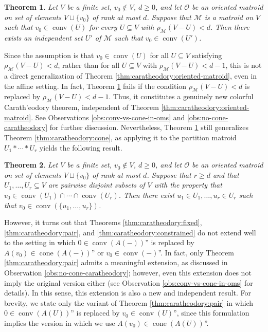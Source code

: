 \documentclass[a4paper,11pt,reqno, english]{amsart}
\newtheorem{theorem}{Theorem}[section]
\theoremstyle{definition}
\theoremstyle{remark}
\DeclareMathOperator{\cone}{\mathrm{cone}}
\DeclareMathOperator{\conv}{\mathrm{conv}}
\begin{document}
\begin{theorem}\label{thm:caratheodory:om-cone-matroid}
    Let $V$ be a finite set, $v_0\notin V$, $d\geq 0$, and let $\mathscr{O}$ be an oriented matroid on set of elements $V\sqcup\{v_0\}$ of rank at most $d$. 
    Suppose that $\mathscr{M}$ is a matroid on $V$ such that $v_0\in\conv(U)$ for every $U\subseteq V$ with $\rho_{\mathscr{M}}(V-U)<d$.
    Then there exists an independent set $U'$ of $\mathscr{M}$ such that  $v_0\in\conv(U')$.
\end{theorem}


Since the assumption is that $v_0\in\conv(U)$ for all $U\subseteq V$ satisfying $\rho_{\mathscr{M}}(V-U)<d$, rather than for all $U\subseteq V$ with $\rho_{\mathscr{M}}(V-U)<d-1$, this is not a direct generalization of Theorem \ref{thm:caratheodory:oriented-matroid}, even in the affine setting. In fact, Theorem \ref{thm:caratheodory:om-cone-matroid} fails if the condition $\rho_{\mathscr{M}}(V-U)<d$ is replaced by $\rho_{\mathscr{M}}(V-U)<d-1$. Thus, it constitutes a genuinely new colorful Carath'eodory theorem, independent of Theorem \ref{thm:caratheodory:oriented-matroid}. See Observations \ref{obs:conv-vs-cone-in-oms} and \ref{obs:no-cone-caratheodory} for further discussion.
Nevertheless, Theorem \ref{thm:caratheodory:om-cone-matroid} still generalizes Theorem \ref{thm:caratheodory:cone}, as applying it to the partition matroid $U_1*\cdots*U_r$ yields the following result.

\begin{theorem}\label{thm:caratheodory:om-cone}
    Let $V$ be a finite set, $v_0\notin V$, $d\geq 0$, and let $\mathscr{O}$ be an oriented matroid on set of elements $V\sqcup\{v_0\}$ of rank at most $d$. 
    Suppose that $r\geq d$ and that $U_1,\ldots,U_r\subseteq V$ are pairwise disjoint subsets of $V$  with the property that $v_0\in\conv(U_1)\cap\cdots\cap\conv(U_r)$.
    Then there exist $u_1\in U_1,\ldots,u_r\in U_r$ such that $v_0\in\conv(\{u_1,\ldots,u_r\})$.
\end{theorem}


However, it turns out that Theorems \ref{thm:caratheodory:fixed}, \ref{thm:caratheodory:pair}, and \ref{thm:caratheodory:constrained} do not extend well to the setting in which $0\in\conv(A(-))$'' is replaced by $A(v_0)\in\cone(A(-))$'' or $v_0\in\conv(-)$''. In fact, only Theorem \ref{thm:caratheodory:pair} admits a meaningful extension, as discussed in Observation \ref{obs:no-cone-caratheodory}; however, even this extension does not imply the original version either (see Observation \ref{obs:conv-vs-cone-in-oms} for details). In this sense, this extension is also a new and independent result. For brevity, we state only the variant of Theorem \ref{thm:caratheodory:pair} in which $0\in\conv(A(U))$'' is replaced by $v_0\in\conv(U)$'', since this formulation implies the version in which we use $A(v_0)\in\cone(A(U))$''.
\end{document}
